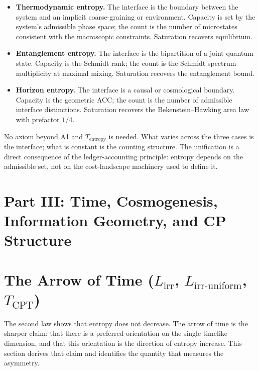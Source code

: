\documentclass[11pt]{article}
\newenvironment{varlist}{\begin{itemize}[nosep,leftmargin=2em]}{\end{itemize}}
\begin{document}
\begin{varlist}
  \item \textbf{Thermodynamic entropy.}  The interface is the boundary
    between the system and an implicit coarse-graining or environment.
    Capacity is set by the system's admissible phase space; the count is
    the number of microstates consistent with the macroscopic constraints.
    Saturation recovers equilibrium.
  \item \textbf{Entanglement entropy.}  The interface is the bipartition of
    a joint quantum state.  Capacity is the Schmidt rank; the count is the
    Schmidt spectrum multiplicity at maximal mixing.  Saturation recovers
    the entanglement bound.
  \item \textbf{Horizon entropy.}  The interface is a causal or cosmological
    boundary.  Capacity is the geometric ACC; the count is the number of
    admissible interface distinctions.  Saturation recovers the
    Bekenstein--Hawking area law with prefactor $1/4$.
\end{varlist}

No axiom beyond A1 and $T_{\mathrm{entropy}}$ is needed.  What varies across
the three cases is the interface; what is constant is the counting
structure.  The unification is a direct consequence of the ledger-accounting
principle: entropy depends on the admissible set, not on the cost-landscape
machinery used to define it.


\section{Part III: Time, Cosmogenesis, Information Geometry, and CP Structure}

\setcounter{subsection}{0}

\section{The Arrow of Time ($L_{\mathrm{irr}}$, $L_{\mathrm{irr\text{-}uniform}}$, $T_{\mathrm{CPT}}$)}
\label{sec:arrow}

The second law shows that entropy does not decrease.  The arrow of time is
the sharper claim: that there is a preferred orientation on the single
timelike dimension, and that this orientation is the direction of entropy
increase.  This section derives that claim and identifies the quantity that
measures the asymmetry.
\end{document}
